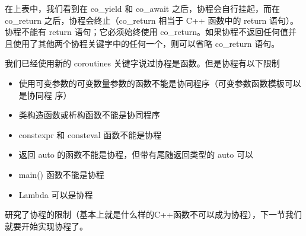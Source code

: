 在上表中，我们看到在 co\_yield 和 co\_await 之后，协程会自行挂起，而在 co\_return 之后，协程会终止（co\_return 相当于 C++ 函数中的 return 语句）。协程不能有 return 语句；它必须始终使用 co\_return。如果协程不返回任何值并且使用了其他两个协程关键字中的任何一个，则可以省略 co\_return 语句。


我们已经使用新的 coroutines 关键字说过协程是函数。但是协程有以下限制

\begin{itemize}
\item
使用可变参数的可变数量参数的函数不能是协同程序（可变参数函数模板可以是协同程
序）

\item
类构造函数或析构函数不能是协同程序

\item
constexpr 和 consteval 函数不能是协程

\item
返回 auto 的函数不能是协程，但带有尾随返回类型的 auto 可以

\item
main() 函数不能是协程

\item
Lambda 可以是协程
\end{itemize}

研究了协程的限制（基本上就是什么样的C++函数不可以成为协程），下一节我们就要开始实现协程了。




















